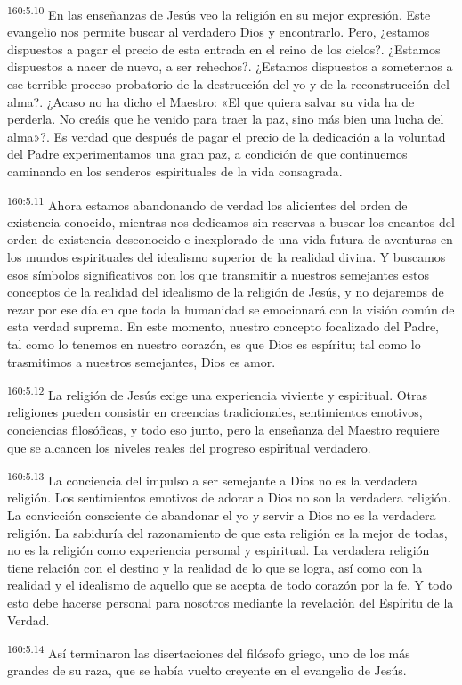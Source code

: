 \par 
\textsuperscript{160:5.10} En las enseñanzas de Jesús veo la religión en su mejor expresión. Este evangelio nos permite buscar al verdadero Dios y encontrarlo. Pero, ¿estamos dispuestos a pagar el precio de esta entrada en el reino de los cielos?. ¿Estamos dispuestos a nacer de nuevo, a ser rehechos?. ¿Estamos dispuestos a someternos a ese terrible proceso probatorio de la destrucción del yo y de la reconstrucción del alma?. ¿Acaso no ha dicho el Maestro: «El que quiera salvar su vida ha de perderla. No creáis que he venido para traer la paz, sino más bien una lucha del alma»?. Es verdad que después de pagar el precio de la dedicación a la voluntad del Padre experimentamos una gran paz, a condición de que continuemos caminando en los senderos espirituales de la vida consagrada.

\par 
\textsuperscript{160:5.11} Ahora estamos abandonando de verdad los alicientes del orden de existencia conocido, mientras nos dedicamos sin reservas a buscar los encantos del orden de existencia desconocido e inexplorado de una vida futura de aventuras en los mundos espirituales del idealismo superior de la realidad divina. Y buscamos esos símbolos significativos con los que transmitir a nuestros semejantes estos conceptos de la realidad del idealismo de la religión de Jesús, y no dejaremos de rezar por ese día en que toda la humanidad se emocionará con la visión común de esta verdad suprema. En este momento, nuestro concepto focalizado del Padre, tal como lo tenemos en nuestro corazón, es que Dios es espíritu; tal como lo trasmitimos a nuestros semejantes, Dios es amor.

\par 
\textsuperscript{160:5.12} La religión de Jesús exige una experiencia viviente y espiritual. Otras religiones pueden consistir en creencias tradicionales, sentimientos emotivos, conciencias filosóficas, y todo eso junto, pero la enseñanza del Maestro requiere que se alcancen los niveles reales del progreso espiritual verdadero.

\par 
\textsuperscript{160:5.13} La conciencia del impulso a ser semejante a Dios no es la verdadera religión. Los sentimientos emotivos de adorar a Dios no son la verdadera religión. La convicción consciente de abandonar el yo y servir a Dios no es la verdadera religión. La sabiduría del razonamiento de que esta religión es la mejor de todas, no es la religión como experiencia personal y espiritual. La verdadera religión tiene relación con el destino y la realidad de lo que se logra, así como con la realidad y el idealismo de aquello que se acepta de todo corazón por la fe. Y todo esto debe hacerse personal para nosotros mediante la revelación del Espíritu de la Verdad.

\par 
\textsuperscript{160:5.14} Así terminaron las disertaciones del filósofo griego, uno de los más grandes de su raza, que se había vuelto creyente en el evangelio de Jesús.